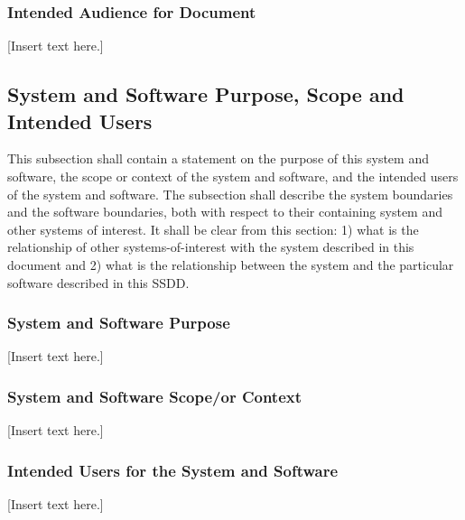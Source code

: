 \documentclass[twoside,letterpaper]{article}
\begin{document}
\subsubsection{Intended Audience for Document}
[Insert text here.]

\subsection{System and Software Purpose, Scope and Intended Users}
This subsection shall contain a statement on the purpose of this system
and software, the scope or context of the system and software, and the
intended users of the system and software. The subsection shall
describe the system boundaries and the software boundaries, both with
respect to their containing system and other systems of interest. It
shall be clear from this section: 1) what is the relationship of other
systems-of-interest with the system described in this document and 2)
what is the relationship between the system and the particular software
described in this SSDD.

\subsubsection{System and Software Purpose}
[Insert text here.]

\subsubsection{System and Software Scope/or Context}
[Insert text here.]

\subsubsection{Intended Users for the System and Software}
[Insert text here.]

\clearpage
\end{document}
